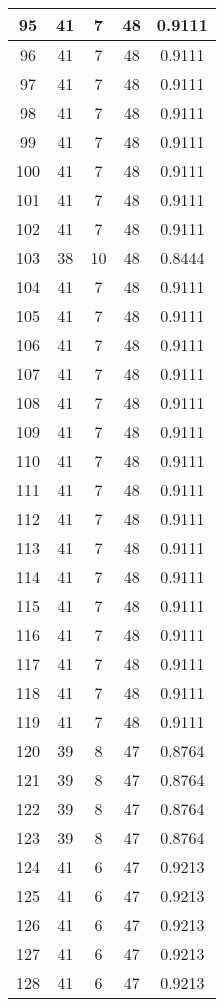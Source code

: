 \documentclass[letterpaper, 12pt]{article}
\begin{document}
\begin{longtable}{|c|c|c|c|c|}
95 & 41 & 7 & 48 & 0.9111 \\
\hline
96 & 41 & 7 & 48 & 0.9111 \\
\hline
97 & 41 & 7 & 48 & 0.9111 \\
\hline
98 & 41 & 7 & 48 & 0.9111 \\
\hline
99 & 41 & 7 & 48 & 0.9111 \\
\hline
100 & 41 & 7 & 48 & 0.9111 \\
\hline
101 & 41 & 7 & 48 & 0.9111 \\
\hline
102 & 41 & 7 & 48 & 0.9111 \\
\hline
103 & 38 & 10 & 48 & 0.8444 \\
\hline
104 & 41 & 7 & 48 & 0.9111 \\
\hline
105 & 41 & 7 & 48 & 0.9111 \\
\hline
106 & 41 & 7 & 48 & 0.9111 \\
\hline
107 & 41 & 7 & 48 & 0.9111 \\
\hline
108 & 41 & 7 & 48 & 0.9111 \\
\hline
109 & 41 & 7 & 48 & 0.9111 \\
\hline
110 & 41 & 7 & 48 & 0.9111 \\
\hline
111 & 41 & 7 & 48 & 0.9111 \\
\hline
112 & 41 & 7 & 48 & 0.9111 \\
\hline
113 & 41 & 7 & 48 & 0.9111 \\
\hline
114 & 41 & 7 & 48 & 0.9111 \\
\hline
115 & 41 & 7 & 48 & 0.9111 \\
\hline
116 & 41 & 7 & 48 & 0.9111 \\
\hline
117 & 41 & 7 & 48 & 0.9111 \\
\hline
118 & 41 & 7 & 48 & 0.9111 \\
\hline
119 & 41 & 7 & 48 & 0.9111 \\
\hline
120 & 39 & 8 & 47 & 0.8764 \\
\hline
121 & 39 & 8 & 47 & 0.8764 \\
\hline
122 & 39 & 8 & 47 & 0.8764 \\
\hline
123 & 39 & 8 & 47 & 0.8764 \\
\hline
124 & 41 & 6 & 47 & 0.9213 \\
\hline
125 & 41 & 6 & 47 & 0.9213 \\
\hline
126 & 41 & 6 & 47 & 0.9213 \\
\hline
127 & 41 & 6 & 47 & 0.9213 \\
\hline
128 & 41 & 6 & 47 & 0.9213 \\

\end{longtable}
\end{document}
